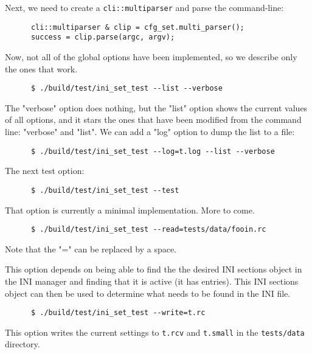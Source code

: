    Next, we need to create a \texttt{cli::multiparser} and parse the
   command-line:

   \begin{verbatim}
      cli::multiparser & clip = cfg_set.multi_parser();
      success = clip.parse(argc, argv);
   \end{verbatim}

   Now, not all of the global options have been implemented, so we describe
   only the ones that work.

   \begin{verbatim}
      $ ./build/test/ini_set_test --list --verbose
   \end{verbatim}

   The "verbose" option does nothing, but the "list" option shows
   the current values of all options, and it stars the ones that
   have been modified from the command line: "verbose" and "list".
   We can add a "log" option to dump the list to a file:

   \begin{verbatim}
      $ ./build/test/ini_set_test --log=t.log --list --verbose
   \end{verbatim}

   The next test option:

   \begin{verbatim}
      $ ./build/test/ini_set_test --test
   \end{verbatim}

   That option is currently a minimal implementation. More to come.

   \begin{verbatim}
      $ ./build/test/ini_set_test --read=tests/data/fooin.rc
   \end{verbatim}

   Note that the "=" can be replaced by a space.

   This option
   depends on being able to find the the desired INI sections object in the
   INI manager and finding that it is active (it has entries).
   This INI sections object can then be used to determine what needs to
   be found in the INI file.

   \begin{verbatim}
      $ ./build/test/ini_set_test --write=t.rc
   \end{verbatim}

   This option writes the current settings to \texttt{t.rcv} and
   \texttt{t.small} in the \texttt{tests/data} directory.

